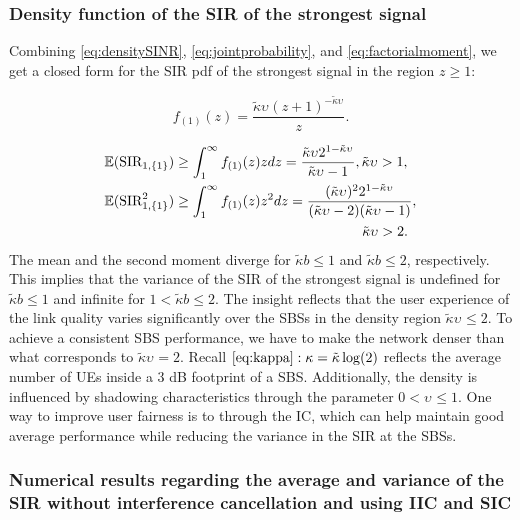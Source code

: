 \documentclass[lettersize,journal]{IEEEtran}
\begin{document}
\subsubsection{Density function of the SIR of the strongest signal}
Combining \eqref{eq:densitySINR}, \eqref{eq:jointprobability}, and \eqref{eq:factorialmoment}, we get a closed form for the SIR pdf of the strongest signal in the region $z\geq 1$:


\begin{equation}
  \label{eq:SIR1}
  f_{(1)}(z) = \frac {\tilde{\kappa}\upsilon_{}\left({z + 1} \right)^{-\tilde{\kappa}\upsilon_{}}} {z}.
\end{equation}




\begin{align}
  &\mathbb{E}(\text{SIR}_{1,\{1\}})  \geq\int_{1}^{\infty}f_{(1)}(z)zdz=\frac{\tilde{\kappa}\upsilon_{}2^{1-\tilde{\kappa}\upsilon_{} }}{\tilde{\kappa}\upsilon_{}-1}, \tilde{\kappa}\upsilon_{} >1, \\
  &\mathbb{E}(\text{SIR}^2_{1,\{1\}}) \geq \int_{1}^{\infty}f_{(1)}(z)z^2dz = \frac{(\tilde{\kappa}\upsilon_{}) ^2 2^{1-\tilde{\kappa}\upsilon_{} }}{(\tilde{\kappa}\upsilon_{} - 2)  (\tilde{\kappa}\upsilon_{} - 1)}, \nonumber\\
  &\hspace{6.5cm}\tilde{\kappa}\upsilon_{}>2 .
\end{align}
The mean and the second moment diverge for $\tilde{\kappa}b\leq 1$ and $\tilde{\kappa}b\leq 2$, respectively. This implies that the variance of the SIR of the strongest signal is undefined for $\tilde{\kappa}b \leq 1$ and infinite for $1 <\tilde{\kappa}b \leq 2$. The insight reflects that the user experience of the link quality varies significantly over the SBSs in the density region $\tilde{\kappa} \upsilon_{} \leq 2$. To achieve a consistent SBS performance, we have to make the network denser than what corresponds to $\tilde{\kappa} \upsilon_{} =2$. Recall $\eqref{eq:kappa}: \kappa = \tilde{\kappa}\log(2)$ reflects the average number of UEs inside a $3$ dB footprint of a SBS.  Additionally, the density is influenced by shadowing characteristics through the parameter  $0<\upsilon_{} \leq 1$. One way to improve user fairness is to through the IC, which can help maintain good average performance while reducing the variance in the SIR at the SBSs.

\subsubsection{Numerical results regarding the average and variance of the SIR without interference cancellation and using IIC and SIC}
\end{document}
